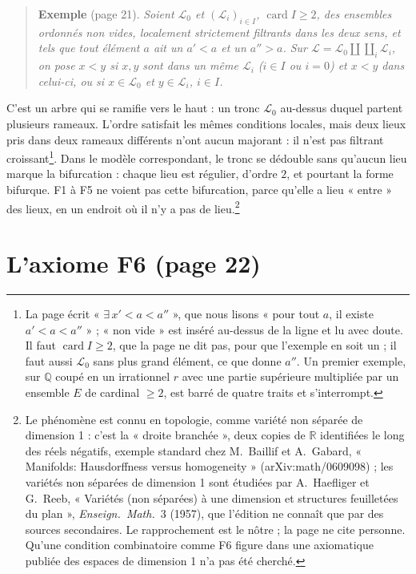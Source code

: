 \documentclass[11pt,a4paper]{article}
\begin{document}
\begin{quote}
\textbf{Exemple} (page 21). \emph{Soient $\mathcal{L}_{0}$ et
$(\mathcal{L}_{i})_{i \in I}$, $\operatorname{card} I \geq 2$, des ensembles
ordonnés non vides, localement strictement filtrants dans les deux sens, et
tels que tout élément $a$ ait un $a' < a$ et un $a'' > a$. Sur $\mathcal{L} =
\mathcal{L}_{0} \amalg \coprod_{i} \mathcal{L}_{i}$, on pose $x < y$ si $x, y$
sont dans un même $\mathcal{L}_{i}$ ($i \in I$ ou $i = 0$) et $x < y$ dans
celui-ci, ou si $x \in \mathcal{L}_{0}$ et $y \in \mathcal{L}_{i}$, $i \in
I$.}
\end{quote}

C'est un arbre qui se ramifie vers le haut : un tronc $\mathcal{L}_{0}$
au-dessus duquel partent plusieurs rameaux. L'ordre satisfait les mêmes
conditions locales, mais deux lieux pris dans deux rameaux différents n'ont
aucun majorant : il n'est pas filtrant croissant\footnote{La page écrit
« $\exists\, x' < a < a''$ », que nous lisons « pour tout $a$, il existe $a' <
a < a''$ » ; « non vide » est inséré au-dessus de la ligne et lu avec doute.
Il faut $\operatorname{card} I \geq 2$, que la page ne dit pas, pour que
l'exemple en soit un ; il faut aussi $\mathcal{L}_{0}$ sans plus grand
élément, ce que donne $a''$. Un premier exemple, sur $\mathbb{Q}$ coupé en un
irrationnel $r$ avec une partie supérieure multipliée par un ensemble $E$ de
cardinal $\geq 2$, est barré de quatre traits et s'interrompt.}. Dans le
modèle correspondant, le tronc se dédouble sans qu'aucun lieu marque la
bifurcation : chaque lieu est régulier, d'ordre $2$, et pourtant la forme
bifurque. F1 à F5 ne voient pas cette bifurcation, parce qu'elle a lieu
« entre » des lieux, en un endroit où il n'y a pas de lieu.\footnote{Le
phénomène est connu en topologie, comme variété non séparée de dimension 1 :
c'est la « droite branchée », deux copies de $\mathbb{R}$ identifiées le long
des réels négatifs, exemple standard chez M.~Baillif et A.~Gabard,
« Manifolds: Hausdorffness versus homogeneity » (arXiv:math/0609098) ; les
variétés non séparées de dimension 1 sont étudiées par A.~Haefliger et
G.~Reeb, « Variétés (non séparées) à une dimension et structures feuilletées
du plan », \emph{Enseign.\ Math.}\ 3 (1957), que l'édition ne connaît que par
des sources secondaires. Le rapprochement est le nôtre ; la page ne cite
personne. Qu'une condition combinatoire comme F6 figure dans une axiomatique
publiée des espaces de dimension 1 n'a pas été cherché.}

\section*{L'axiome F6 (page 22)}
\end{document}
